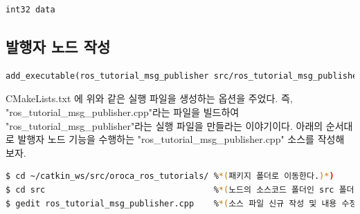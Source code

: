 \begin{lstlisting}[language=ROS]
int32 data
\end{lstlisting}

\subsection{발행자 노드 작성}

\begin{lstlisting}[language=make]
add_executable(ros_tutorial_msg_publisher src/ros_tutorial_msg_publisher.cpp)
\end{lstlisting}

CMakeLists.txt 에 위와 같은 실행 파일을 생성하는 옵션을 주었다. 즉, "ros\_tutorial\_msg\_publisher.cpp"라는 파일을 빌드하여 "ros\_tutorial\_msg\_publisher"라는 실행 파일을 만들라는 이야기이다. 아래의 순서대로 발행자 노드 기능을 수행하는 "ros\_tutorial\_msg\_publisher.cpp" 소스를 작성해 보자. 

\begin{lstlisting}[language=bash]
$ cd ~/catkin_ws/src/oroca_ros_tutorials/ %*(패키지 폴더로 이동한다.)*)
$ cd src                                  %*(노드의 소스코드 폴더인 src 폴더로 이동)*)
$ gedit ros_tutorial_msg_publisher.cpp    %*(소스 파일 신규 작성 및 내용 수정)*)
\end{lstlisting}

